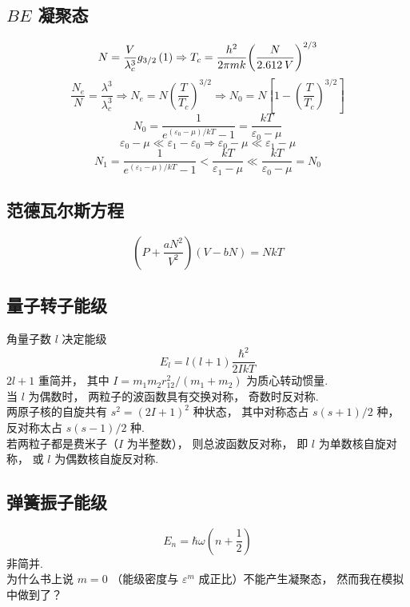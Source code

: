 \subsection{$BE$ 凝聚态}
\begin{equation}
  N = \frac{V}{{\lambda _c^3}}{g_{3/2}}\left( 1 \right) \Rightarrow {T_c} = \frac{{{h^2}}}{{2\pi mk}}{\left( {\frac{N}{{2.612{\kern 1pt} {\kern 1pt} V}}} \right)^{2/3}}
\end{equation}
\begin{equation}
  \frac{{{N_e}}}{N} = \frac{{{\lambda ^3}}}{{\lambda _c^3}} \Rightarrow {N_e} = N{\left( {\frac{T}{{{T_c}}}} \right)^{3/2}} \Rightarrow {N_0} = N\left[ {1 - {{\left( {\frac{T}{{{T_c}}}} \right)}^{3/2}}} \right]
\end{equation}
\begin{equation}
  {N_0} = \frac{1}{{{e^{({\varepsilon _0} - \mu )/kT}} - 1}} = \frac{{kT}}{{{\varepsilon _0} - \mu }}
\end{equation}
\begin{equation}
  {\varepsilon _0} - \mu  \ll {\varepsilon _1} - {\varepsilon _0} \Rightarrow {\varepsilon _0} - \mu  \ll {\varepsilon _1} - \mu 
\end{equation}
\begin{equation}
  {N_1} = \frac{1}{{{e^{({\varepsilon _1} - \mu )/kT}} - 1}} < \frac{{kT}}{{{\varepsilon _1} - \mu }} \ll \frac{{kT}}{{{\varepsilon _0} - \mu }} = {N_0}
\end{equation}
\subsection{范德瓦尔斯方程}
\begin{equation}
  \left( {P + \frac{{a{N^2}}}{{{V^2}}}} \right)\left( {V - bN} \right) = NkT
\end{equation}
\subsection{量子转子能级}
角量子数 $l$ 决定能级
\begin{equation}
  {E_l} = l\left( {l + 1} \right)\frac{{{\hbar ^2}}}{{2IkT}}
\end{equation}
$2l+1$ 重简并， 其中 $I = {{{m_1}{m_2}r_{12}^2}}/({{{m_1} + {m_2}}})$ 为质心转动惯量.\\
当 $l$ 为偶数时， 两粒子的波函数具有交换对称， 奇数时反对称.\\
两原子核的自旋共有 ${s^2} = {\left( {2I + 1} \right)^2}$ 种状态， 其中对称态占 ${{s\left( {s + 1} \right)}}/{2}$ 种， 反对称太占 ${{s\left( {s - 1} \right)}}/{2}$ 种.\\
若两粒子都是费米子（$I$ 为半整数）， 则总波函数反对称， 即 $l$ 为单数核自旋对称， 或 $l$ 为偶数核自旋反对称.\\
\subsection{弹簧振子能级}
\begin{equation}
  {E_n} = \hbar \omega \left( {n + \frac{1}{2}} \right)
\end{equation}
非简并.\\
为什么书上说 $m = 0 $ （能级密度与 ${\varepsilon ^m}$ 成正比）不能产生凝聚态， 然而我在模拟中做到了？\\